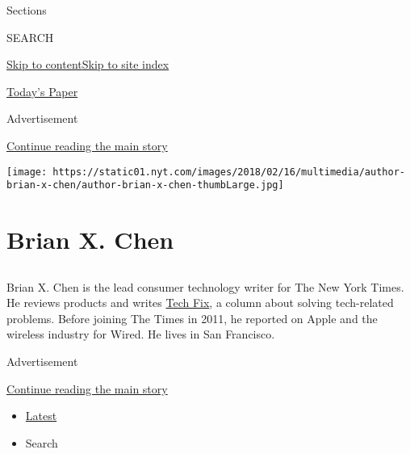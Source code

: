 Sections

SEARCH

\protect\hyperlink{site-content}{Skip to
content}\protect\hyperlink{site-index}{Skip to site index}

\href{https://myaccount.nytimes.com/auth/login?response_type=cookie\&client_id=vi}{}

\href{https://www.nytimes.com/section/todayspaper}{Today's Paper}

Advertisement

\protect\hyperlink{after-top}{Continue reading the main story}

\texttt{[image: https://static01.nyt.com/images/2018/02/16/multimedia/author-brian-x-chen/author-brian-x-chen-thumbLarge.jpg]}

\hypertarget{brian-x-chen}{%
\section{Brian X. Chen}\label{brian-x-chen}}

\subsection{}

Brian X. Chen is the lead consumer technology writer for The New York
Times. He reviews products and writes
\href{http://www.nytimes.com/column/tech-fix}{Tech Fix}, a column about
solving tech-related problems. Before joining The Times in 2011, he
reported on Apple and the wireless industry for Wired. He lives in San
Francisco.

Advertisement

\protect\hyperlink{after-mid1}{Continue reading the main story}

\begin{itemize}
\tightlist
\item
  \protect\hyperlink{stream-panel}{Latest}
\item
  Search
\end{itemize}

